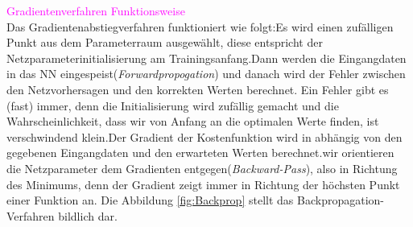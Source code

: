 \documentclass[12pt,a4paper]{scrartcl}
\numberwithin{equation}{section}
\begin{document}
\textcolor{magenta}{Gradientenverfahren Funktionsweise}\\
Das Gradientenabstiegverfahren funktioniert wie folgt:Es wird einen zufälligen Punkt aus dem Parameterraum ausgewählt, diese entspricht der Netzparameterinitialisierung am Trainingsanfang.Dann werden die Eingangdaten in das \ac{NN} eingespeist(\textit{Forwardpropogation}) und danach wird der Fehler zwischen den Netzvorhersagen und den korrekten Werten berechnet. Ein Fehler gibt es (fast) immer, denn die Initialisierung wird zufällig gemacht und die Wahrscheinlichkeit, dass wir von Anfang an die optimalen Werte finden, ist verschwindend klein.Der Gradient der Kostenfunktion wird in abhängig von den gegebenen Eingangdaten und den erwarteten Werten berechnet.wir orientieren die Netzparameter dem Gradienten entgegen(\textit{Backward-Pass}), also in Richtung des Minimums, denn der Gradient zeigt immer in Richtung der höchsten Punkt einer Funktion an. Die Abbildung \ref{fig:Backprop} stellt das Backpropagation-Verfahren bildlich dar.
\end{document}
